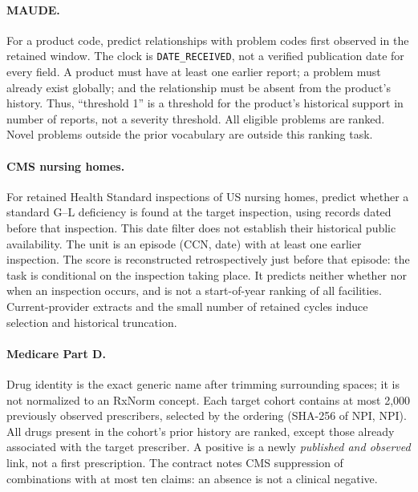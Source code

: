 \paragraph{MAUDE.} For a product code, predict relationships with problem codes first observed in the retained window. The clock is \texttt{DATE\_RECEIVED}, not a verified publication date for every field. A product must have at least one earlier report; a problem must already exist globally; and the relationship must be absent from the product's history. Thus, “threshold 1” is a threshold for the product's historical support in number of reports, not a severity threshold. All eligible problems are ranked. Novel problems outside the prior vocabulary are outside this ranking task\cite{hgbcontract,hgbcode}.

\paragraph{CMS nursing homes.} For retained Health Standard inspections of US nursing homes, predict whether a standard G--L deficiency is found at the target inspection, using records dated before that inspection. This date filter does not establish their historical public availability. The unit is an episode (CCN, date) with at least one earlier inspection. The score is reconstructed retrospectively just before that episode: the task is conditional on the inspection taking place. It predicts neither whether nor when an inspection occurs, and is not a start-of-year ranking of all facilities. Current-provider extracts and the small number of retained cycles induce selection and historical truncation\cite{cmsnursing,hgbcontract,hgbcode}.

\paragraph{Medicare Part D.} Drug identity is the exact generic name after trimming surrounding spaces; it is not normalized to an RxNorm concept. Each target cohort contains at most 2,000 previously observed prescribers, selected by the ordering (SHA-256 of NPI, NPI). All drugs present in the cohort's prior history are ranked, except those already associated with the target prescriber. A positive is a newly \emph{published and observed} link, not a first prescription. The contract notes CMS suppression of combinations with at most ten claims: an absence is not a clinical negative\cite{cmspartd,hgbpartd}.

